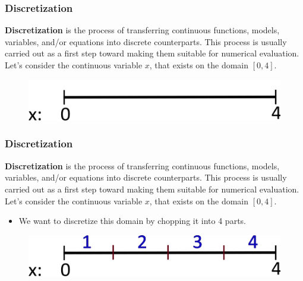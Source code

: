\documentclass{if-beamer}
\begin{document}
\begin{frame}
\frametitle{Discretization}
\textbf{Discretization} is the process of transferring continuous functions, models, variables, and/or equations into discrete counterparts. This process is usually carried out as a first step toward making them suitable for numerical evaluation.\\
\vspace{5pt}
Let's consider the continuous variable $x$, that exists on the domain $[0,4]$. 

\begin{figure}
	\centering
	\includegraphics[width = .8\textwidth]{figures/space1}
\end{figure}
\end{frame} 

\begin{frame}
\frametitle{Discretization}
\textbf{Discretization} is the process of transferring continuous functions, models, variables, and/or equations into discrete counterparts. This process is usually carried out as a first step toward making them suitable for numerical evaluation.\\
\vspace{5pt}
Let's consider the continuous variable $x$, that exists on the domain $[0,4]$. \\
\begin{itemize}
	\item We want to discretize this domain by chopping it into 4 parts.
\end{itemize}

\begin{figure}
	\centering
	\includegraphics[width = .8\textwidth]{figures/space2}
\end{figure}
\end{frame} 
\end{document}
